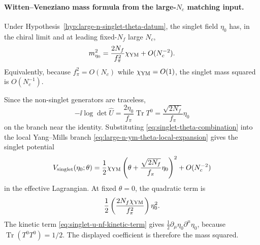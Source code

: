 \paragraph{Witten--Veneziano mass formula from the large-\(N_c\) matching input.}
Under Hypothesis~\ref{hyp:large-n-singlet-theta-datum}, the singlet field
\(\eta_0\) has, in the chiral limit and at leading fixed-\(N_f\) large
\(N_c\),
\begin{equation}
  m_{\eta_0}^2
  =
  \frac{2N_f}{f_\pi^2}\chi_{\rm YM}
  +O(N_c^{-2}) .
  \label{eq:witten-veneziano-chiral-limit}
\end{equation}
Equivalently, because \(f_\pi^2=O(N_c)\) while
\(\chi_{\rm YM}=O(1)\), the singlet mass squared is \(O(N_c^{-1})\).

Since the non-singlet generators are traceless,
\begin{equation}
  -\ii\log\det\widehat U
  =
  \frac{2\eta_0}{f_\pi}\operatorname{Tr}T^0
  =
  \frac{\sqrt{2N_f}}{f_\pi}\eta_0
  \label{eq:singlet-determinant-phase}
\end{equation}
on the branch near the identity.  Substituting
\eqref{eq:singlet-theta-combination} into the local Yang--Mills branch
\eqref{eq:large-n-ym-theta-local-expansion} gives the singlet potential
\[
  V_{\rm singlet}(\eta_0;\theta)
  =
  \frac12\chi_{\rm YM}
  \left(
    \theta+\frac{\sqrt{2N_f}}{f_\pi}\eta_0
  \right)^2
  +O(N_c^{-2})
  \]
in the effective Lagrangian.  At fixed \(\theta=0\), the quadratic term is
\[
  \frac12
  \left(\frac{2N_f\chi_{\rm YM}}{f_\pi^2}\right)\eta_0^2 .
  \]
The kinetic term
\eqref{eq:singlet-u-nf-kinetic-term} gives
\(\frac12\partial_\mu\eta_0\partial^\mu\eta_0\), because
\(\operatorname{Tr}(T^0T^0)=1/2\).  The displayed coefficient is therefore the
mass squared.

